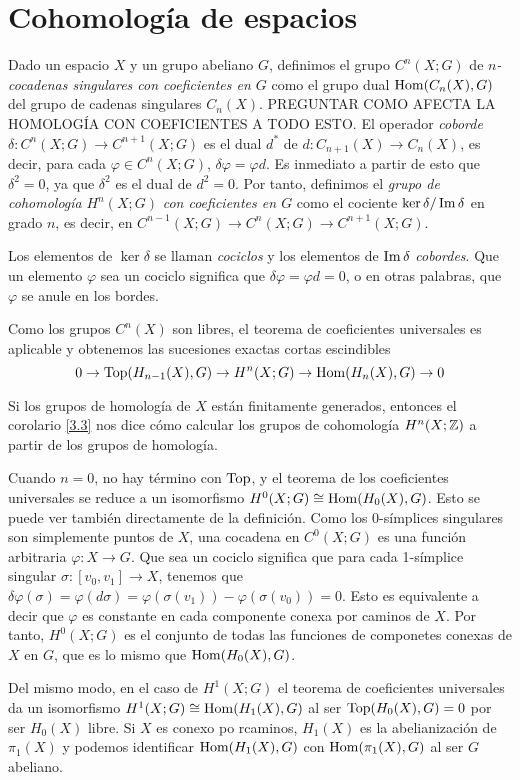 \documentclass[TA.tex]{subfiles}
\begin{document}
\section{Cohomología de espacios}

Dado un espacio $X$ y un grupo abeliano $G$, definimos el grupo $C^n(X;G)$ de \emph{$n$-cocadenas singulares con coeficientes en $G$} como el grupo dual $\operatorname{Hom}(C_n(X),G)$ del grupo de cadenas singulares $C_n(X)$. PREGUNTAR COMO AFECTA LA HOMOLOGÍA CON COEFICIENTES A TODO ESTO. El operador \emph{coborde} $\delta:C^n(X;G)\to C^{n+1}(X;G)$ es el dual $d^*$ de $d:C_{n+1}(X)\to C_n(X)$, es decir, para cada $\varphi\in C^n(X;G)$, $\delta\varphi=\varphi d$. Es inmediato a partir de esto que $\delta^2=0$, ya que $\delta^2$ es el dual de $d^2=0$. Por tanto, definimos el \emph{grupo de cohomología} $H^n(X;G)$ \emph{con coeficientes en $G$} como el cociente $\ker\delta/\operatorname{Im}\delta$ en grado $n$, es decir, en $C^{n-1}(X;G)\to C^n(X;G)\to C^{n+1}(X;G)$.

Los elementos de $\ker\delta$ se llaman \emph{cociclos} y los elementos de $\operatorname{Im}\delta$ \emph{cobordes}. Que un elemento $\varphi$ sea un cociclo significa que $\delta\varphi=\varphi d=0$, o en otras palabras, que $\varphi$ se anule en los bordes.

Como los grupos $C^n(X)$ son libres, el teorema de coeficientes universales es aplicable y obtenemos las sucesiones exactas cortas escindibles
\[0\to \operatorname{Top}(H_{n-1}(X),G)\to H^n(X;G)\to\operatorname{Hom}(H_n(X),G)\to 0\]

Si los grupos de homología de $X$ están finitamente generados, entonces el corolario \ref{3.3} nos dice cómo calcular los grupos de cohomología $H^n(X;\mathbb{Z})$ a partir de los grupos de homología.

Cuando $n=0$, no hay término con $\operatorname{Top}$, y el teorema de los coeficientes universales se reduce a un isomorfismo $H^0(X;G)\cong \operatorname{Hom}(H_0(X),G)$. Esto se puede ver también directamente de la definición. Como los 0-símplices singulares son simplemente puntos de $X$, una cocadena en $C^0(X;G)$ es una función arbitraria $\varphi:X\to G$. Que sea un cociclo significa que para cada 1-símplice singular $\sigma:[v_0,v_1]\to X$, tenemos que $\delta\varphi(\sigma)=\varphi(d\sigma)=\varphi(\sigma(v_1))-\varphi(\sigma(v_0))=0$. Esto es equivalente a decir que $\varphi$ es constante en cada componente conexa por caminos de $X$. Por tanto, $H^0(X;G)$ es el conjunto de todas las funciones de componetes conexas de $X$ en $G$, que es lo mismo que $\operatorname{Hom}(H_0(X),G)$. 

Del mismo modo, en el caso de $H^1(X;G)$ el teorema de coeficientes universales da un isomorfismo $H^1(X;G)\cong\operatorname{Hom}(H_1(X),G)$ al ser $\operatorname{Top}(H_0(X),G)=0$ por ser $H_0(X)$ libre. Si $X$ es conexo po rcaminos, $H_1(X)$ es la abelianización de $\pi_1(X)$ y podemos identificar $\operatorname{Hom}(H_1(X),G)$ con $\operatorname{Hom}(\pi_1(X),G)$ al ser $G$ abeliano.
\end{document}
